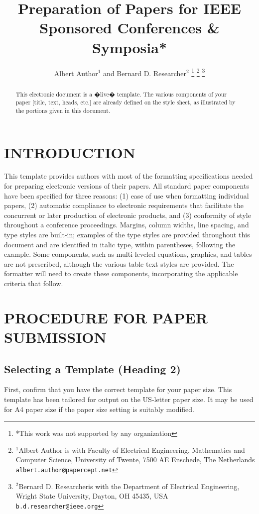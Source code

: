 \documentclass[letterpaper, 10 pt, conference]{ieeeconf}  %
\title{\LARGE \bf
Preparation of Papers for IEEE Sponsored Conferences \& Symposia*
}
\author{Albert Author$^{1}$ and Bernard D. Researcher$^{2}$%
\thanks{*This work was not supported by any organization}%
\thanks{$^{1}$Albert Author is with Faculty of Electrical Engineering, Mathematics and Computer Science,
        University of Twente, 7500 AE Enschede, The Netherlands
        {\tt\small albert.author@papercept.net}}%
\thanks{$^{2}$Bernard D. Researcheris with the Department of Electrical Engineering, Wright State University,
        Dayton, OH 45435, USA
        {\tt\small b.d.researcher@ieee.org}}%
}
\begin{document}
\maketitle
\thispagestyle{empty}
\pagestyle{empty}


\begin{abstract}

This electronic document is a �live� template. The various components of your paper [title, text, heads, etc.] are already defined on the style sheet, as illustrated by the portions given in this document.

\end{abstract}


\section{INTRODUCTION}
\the\textwidth

\the\columnwidth

This template provides authors with most of the formatting specifications needed for preparing electronic versions of their papers. All standard paper components have been specified for three reasons: (1) ease of use when formatting individual papers, (2) automatic compliance to electronic requirements that facilitate the concurrent or later production of electronic products, and (3) conformity of style throughout a conference proceedings. Margins, column widths, line spacing, and type styles are built-in; examples of the type styles are provided throughout this document and are identified in italic type, within parentheses, following the example. Some components, such as multi-leveled equations, graphics, and tables are not prescribed, although the various table text styles are provided. The formatter will need to create these components, incorporating the applicable criteria that follow.

\section{PROCEDURE FOR PAPER SUBMISSION}

\subsection{Selecting a Template (Heading 2)}

First, confirm that you have the correct template for your paper size. This template has been tailored for output on the US-letter paper size. 
It may be used for A4 paper size if the paper size setting is suitably modified.
\end{document}
